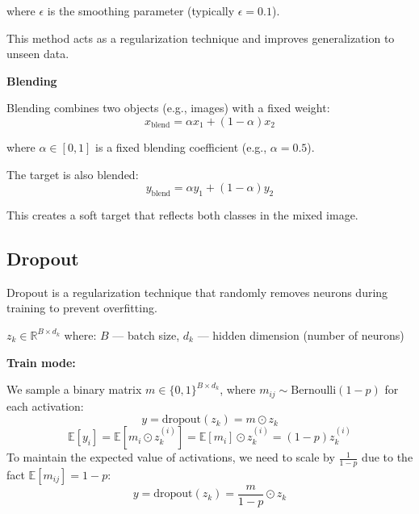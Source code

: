 \documentclass[12pt]{article}
\begin{document}
where $\epsilon$ is the smoothing parameter (typically $\epsilon = 0.1$).



This method acts as a regularization technique and improves generalization to unseen data.

\textbf{Blending}

Blending combines two objects (e.g., images) with a fixed weight:
$$x_{\text{blend}} = \alpha x_1 + (1 - \alpha) x_2$$

where $\alpha \in [0, 1]$ is a fixed blending coefficient (e.g., $\alpha = 0.5$).

The target is also blended:
$$y_{\text{blend}} = \alpha y_1 + (1 - \alpha) y_2$$

This creates a soft target that reflects both classes in the mixed image.


\subsection{Dropout}

Dropout is a regularization technique that randomly removes neurons during training to prevent overfitting.

 $z_k \in \mathbb{R}^{B \times d_k}$ where: $B$ — batch size, $d_k$ — hidden dimension (number of neurons)

\textbf{Train mode:}

We sample a binary matrix $m \in  \{0,1 \}^{B \times d_k}$, where $m_{ij} \sim \text{Bernoulli}(1 - p)$ for each activation:
$$y = \text{dropout}(z_k) = m \odot z_k$$
$$\mathbb{E}[y_i] = \mathbb{E}[m_i \odot z_k^{(i)}] = \mathbb{E}[m_i]\odot z_k^{(i)} = (1-p) z_k^{(i)} $$
To maintain the expected value of activations, we need to scale by $\frac{1}{1-p}$ due to the fact $\mathbb{E}[m_{ij}] = 1-p$:
$$y = \text{dropout}(z_k) = \frac{m}{1-p} \odot z_k$$
\end{document}
